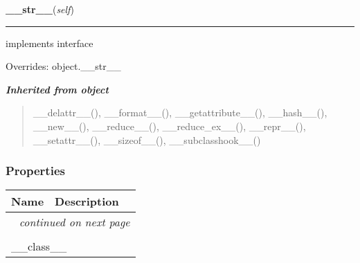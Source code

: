     \vspace{0.5ex}

\hspace{.8\funcindent}\begin{boxedminipage}{\funcwidth}

    \raggedright \textbf{\_\_str\_\_}(\textit{self})

    \vspace{-1.5ex}

    \rule{\textwidth}{0.5\fboxrule}
\setlength{\parskip}{2ex}
    implements interface

\setlength{\parskip}{1ex}
      Overrides: object.\_\_str\_\_

    \end{boxedminipage}


\large{\textbf{\textit{Inherited from object}}}

\begin{quote}
\_\_delattr\_\_(), \_\_format\_\_(), \_\_getattribute\_\_(), \_\_hash\_\_(), \_\_new\_\_(), \_\_reduce\_\_(), \_\_reduce\_ex\_\_(), \_\_repr\_\_(), \_\_setattr\_\_(), \_\_sizeof\_\_(), \_\_subclasshook\_\_()
\end{quote}


  \subsubsection{Properties}

    \vspace{-1cm}
\hspace{\varindent}\begin{longtable}{|p{\varnamewidth}|p{\vardescrwidth}|l}
\cline{1-2}
\cline{1-2} \centering \textbf{Name} & \centering \textbf{Description}& \\
\cline{1-2}
\endhead\cline{1-2}\multicolumn{3}{r}{\small\textit{continued on next page}}\\\endfoot\cline{1-2}
\endlastfoot\multicolumn{2}{|l|}{\textit{Inherited from object}}\\
\multicolumn{2}{|p{\varwidth}|}{\raggedright \_\_class\_\_}\\
\cline{1-2}
\end{longtable}

